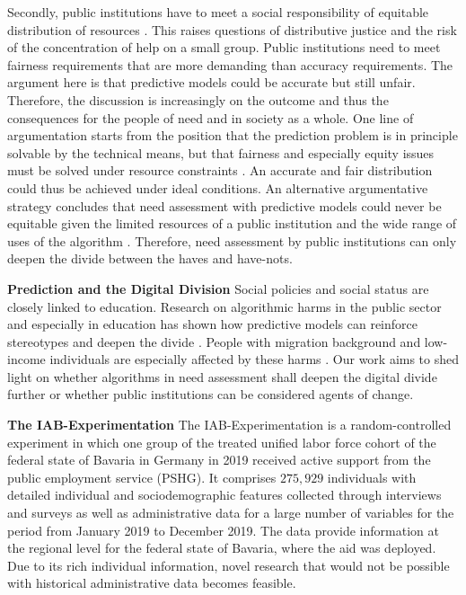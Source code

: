 \documentclass{article} %
\begin{document}
Secondly, public institutions have to meet a social responsibility of equitable distribution of resources \cite{kleinberg2015prediction}. This raises questions of distributive justice and the risk of the concentration of help on a small group. Public institutions need to meet fairness requirements that are more demanding than accuracy requirements. The argument here is that predictive models could be accurate but still unfair. Therefore, the discussion is increasingly on the outcome and thus the consequences for the people of need and in society as a whole. One line of argumentation starts from the position that the prediction problem is in principle solvable by the technical means, but that fairness and especially equity issues must be solved under resource constraints \cite{loriprovist2022,pmlr-v235-perdomo24a, wilder2024learning}. An accurate and fair distribution could thus be achieved under ideal conditions. An alternative argumentative strategy concludes that need assessment with predictive models could never be equitable given the limited resources of a public institution and the wide range of uses of the algorithm \cite{simone2022}. Therefore, need assessment by public institutions can only deepen the divide between the haves and have-nots.

\textbf{Prediction and the Digital Division}
Social policies and social status are closely linked to education. Research on algorithmic harms in the public sector and especially in education has shown how predictive models can reinforce stereotypes and deepen the divide \cite{chouldechova2018case}. People with migration background and low-income individuals are especially affected by these harms \cite{perdomo2023difficult}. Our work aims to shed light on whether algorithms in need assessment shall deepen the digital divide further or whether public institutions can be considered agents of change.

\textbf{The IAB-Experimentation} The IAB-Experimentation \cite{10.1145/3588001.3609369} is a random-controlled experiment in which one group of the treated unified labor force cohort of the federal state of Bavaria in Germany in 2019 received active support from the public employment service (PSHG). It comprises $275{,}929$ individuals with detailed individual and sociodemographic features collected through interviews and surveys as well as administrative data for a large number of variables for the period from January 2019 to December 2019. The data provide information at the regional level for the federal state of Bavaria, where the aid was deployed. Due to its rich individual information, novel research that would not be possible with historical administrative data becomes feasible.
\end{document}
